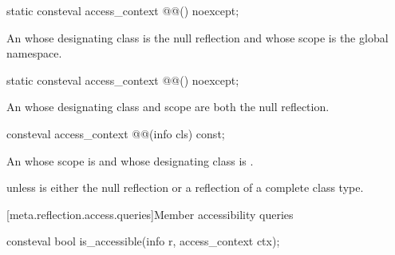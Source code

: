 \begin{itemdecl}
static consteval access_context @@() noexcept;
\end{itemdecl}

\begin{itemdescr}
\pnum
\returns
An  whose designating class is the null reflection
and whose scope is the global namespace.
\end{itemdescr}

\begin{itemdecl}
static consteval access_context @@() noexcept;
\end{itemdecl}

\begin{itemdescr}
\pnum
\returns
An  whose designating class and scope
are both the null reflection.
\end{itemdescr}

\begin{itemdecl}
consteval access_context @@(info cls) const;
\end{itemdecl}

\begin{itemdescr}
\pnum
\returns
An  whose scope is 
and whose designating class is .

\pnum
\throws
{} unless
 is either the null reflection
or a reflection of a complete class type.
\end{itemdescr}

[meta.reflection.access.queries]{Member accessibility queries}

%
\begin{itemdecl}
consteval bool is_accessible(info r, access_context ctx);
\end{itemdecl}

